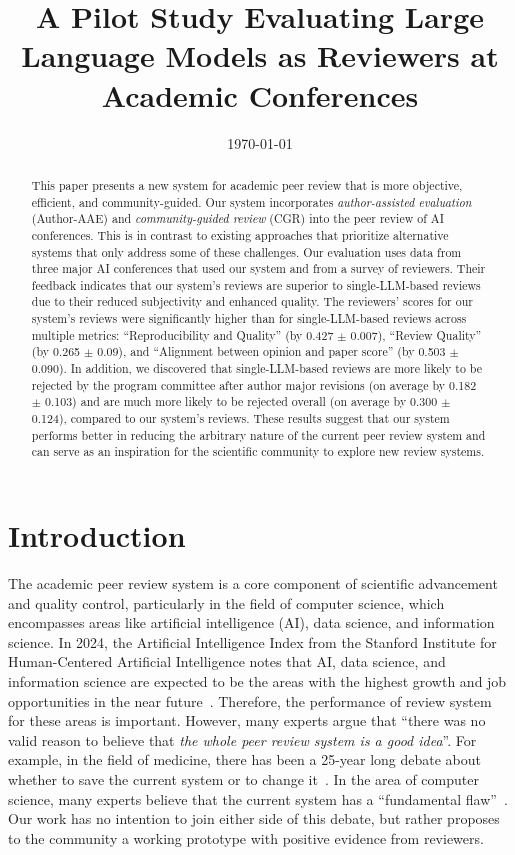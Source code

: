 \documentclass{article} %
\date{\today}
\title{A Pilot Study Evaluating Large Language Models as Reviewers at Academic Conferences}
\begin{document}
\maketitle

\begin{abstract}
This paper presents a new system for academic peer review that is more objective, efficient, and community-guided. Our system incorporates \emph{author-assisted evaluation} (Author-AAE) and \emph{community-guided review} (CGR) into the peer review of AI conferences. This is in contrast to existing approaches that prioritize alternative systems that only address some of these challenges. Our evaluation uses data from three major AI conferences that used our system and from a survey of reviewers. Their feedback indicates that our system's reviews are superior to single-LLM-based reviews due to their reduced subjectivity and enhanced quality. The reviewers' scores for our system's reviews were significantly higher than for single-LLM-based reviews across multiple metrics: ``Reproducibility and Quality'' (by 0.427 $\pm$ 0.007), ``Review Quality'' (by 0.265 $\pm$ 0.09), and ``Alignment between opinion and paper score'' (by 0.503 $\pm$ 0.090). 
In addition, we discovered that single-LLM-based reviews are more likely to be rejected by the program committee after author major revisions (on average by 0.182 $\pm$ 0.103) and are much more likely to be rejected overall (on average by 0.300 $\pm$ 0.124), compared to our system's reviews. These results suggest that our system performs better in reducing the arbitrary nature of the current peer review system and can serve as an inspiration for the scientific community to explore new review systems. 
\end{abstract}

\section{Introduction}


\label{sec:intro}

The academic peer review system is a core component of scientific advancement and quality control, particularly in the field of computer science, which encompasses areas like artificial intelligence (AI), data science, and information science. In 2024, the Artificial Intelligence Index from the Stanford Institute for Human-Centered Artificial Intelligence notes that AI, data science, and information science are expected to be the areas with the highest growth and job opportunities in the near future~\citep{AIindexreport}. Therefore, the performance of review system for these areas is important. However, many experts argue that ``there was no valid reason to believe that \textit{the whole peer review system is a good idea}''. For example, in the field of medicine, there has been a 25-year long debate about whether to save the current system or to change it~\citep{van2012intended}. In the area of computer science, many experts believe that the current system has a ``fundamental flaw''~\citep{shah2022challenges, nicholson2016brief, tran2020open}. Our work has no intention to join either side of this debate, but rather proposes to the community a working prototype with positive evidence from reviewers.
\end{document}
